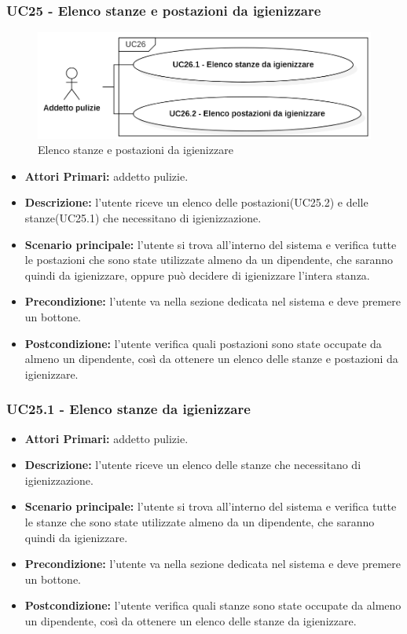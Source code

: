 \subsubsection{ UC25 - Elenco stanze e postazioni da igienizzare}
\begin{figure}[H]
		\centering
		\includegraphics[width=15cm]{res/images/UC25.png}
		\caption{Elenco stanze e postazioni da igienizzare}
		\label{fig:Elenco stanze e postazioni da igienizzare}
	\end{figure}
\begin{itemize}
           	\item\textbf{Attori Primari:} addetto pulizie.
           	\item\textbf{Descrizione:} l'utente riceve un elenco delle postazioni(UC25.2) e delle stanze(UC25.1) che necessitano di igienizzazione.
           	\item\textbf{Scenario principale:} l'utente si trova all'interno del sistema e verifica tutte le postazioni che sono state utilizzate almeno da un dipendente, che saranno quindi da igienizzare, oppure può decidere di igienizzare l’intera stanza.
           	\item\textbf{Precondizione:} l'utente va nella sezione dedicata nel sistema e deve premere un bottone.
           	\item\textbf{Postcondizione:} l'utente verifica quali postazioni sono state occupate da almeno un dipendente, così da ottenere un elenco delle stanze e postazioni da igienizzare.
\end{itemize}

\subsubsection{UC25.1 - Elenco stanze da igienizzare}
\begin{itemize}
           	\item\textbf{Attori Primari:} addetto pulizie.
           	\item\textbf{Descrizione:} l'utente riceve un elenco delle stanze che necessitano di igienizzazione.
           	\item\textbf{Scenario principale:} l'utente si trova all'interno del sistema e verifica tutte le stanze che sono state utilizzate almeno da un dipendente, che saranno quindi da igienizzare.
           	\item\textbf{Precondizione:} l'utente va nella sezione dedicata nel sistema e deve premere un bottone.
           	\item\textbf{Postcondizione:} l'utente verifica quali stanze sono state occupate da almeno un dipendente, così da ottenere un elenco delle stanze da igienizzare.
\end{itemize}
